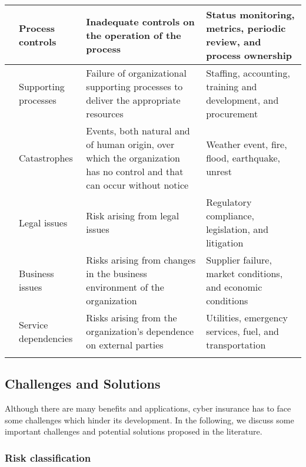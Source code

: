 \documentclass[twocolumn,10pt]{IEEEtran}
\begin{document}
\begin{table*}[!]
\begin{centering}
\begin{tabular}{|>{\centering\arraybackslash}m{1.2cm}|>{\centering\arraybackslash}m{1.7cm}|>{\centering\arraybackslash}m{6.2cm}|>{\centering\arraybackslash}m{5.8cm}|}
			& Process controls & Inadequate controls on the operation of the process & Status monitoring, metrics, periodic review, and process ownership 	\tabularnewline	\cline{2-4} 
			& Supporting processes & Failure of organizational supporting processes to deliver the appropriate resources & Staffing, accounting, training and development, and procurement  	\tabularnewline 	\cline{2-4} 
			\hline 
			\multirow{5}{*}{\parbox{1.2cm}{External events}}	
			& Catastrophes & Events, both natural and of human origin, over which the organization has no control and that can occur without notice & Weather event, fire, flood, earthquake, unrest 	\tabularnewline 	\cline{2-4} 
			& Legal issues & Risk arising from legal issues & Regulatory compliance, legislation, and litigation 	\tabularnewline 	\cline{2-4} 		
			& Business issues & Risks arising from changes in the business environment of the organization & Supplier failure, market conditions, and economic conditions 	\tabularnewline	\cline{2-4} 
			& Service dependencies & Risks arising from the organization's dependence on external parties & Utilities, emergency services, fuel, and transportation  	\tabularnewline 	\cline{2-4} 
			\hline 					
		\end{tabular}
		\par\end{centering}
\end{table*}



\subsection{Challenges and Solutions}

Although there are many benefits and applications, cyber insurance has to face some challenges which hinder its development. In the following, we discuss some important challenges and potential solutions proposed in the literature. 


\subsubsection{Risk classification}
\end{document}
